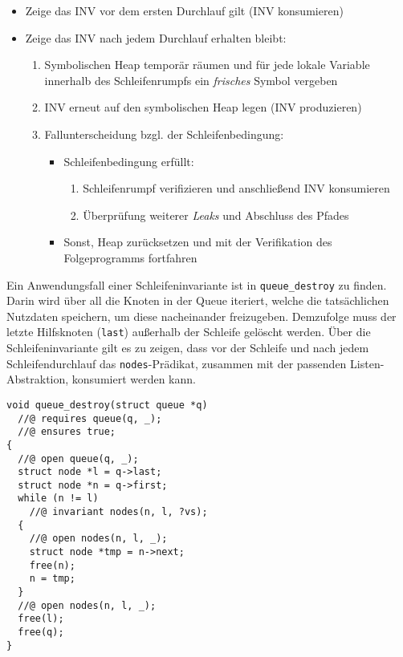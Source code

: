 \begin{itemize}
	\item Zeige das INV vor dem ersten Durchlauf gilt (INV konsumieren)
	\item Zeige das INV nach jedem Durchlauf erhalten bleibt:
	\begin{enumerate}
		\item Symbolischen Heap temporär räumen und für jede lokale Variable innerhalb des Schleifenrumpfs ein \emph{frisches} Symbol vergeben
		\item INV erneut auf den symbolischen Heap legen (INV produzieren)
		\item Fallunterscheidung bzgl. der Schleifenbedingung: %
		\begin{itemize}
			\setlength\itemsep{1ex}
			\item Schleifenbedingung erfüllt:
			\begin{enumerate}
				\item Schleifenrumpf verifizieren und anschließend INV konsumieren
				\item Überprüfung weiterer \emph{Leaks} und Abschluss des Pfades
			\end{enumerate}
			\item Sonst, Heap zurücksetzen und mit der Verifikation des Folgeprogramms fortfahren
		\end{itemize}
	\end{enumerate}
\end{itemize}

\noindent
Ein Anwendungsfall einer Schleifeninvariante ist in \texttt{queue\_destroy} zu finden. Darin wird über all die Knoten in der Queue iteriert, welche die tatsächlichen Nutzdaten speichern, um diese nacheinander freizugeben. Demzufolge muss der letzte Hilfsknoten (\texttt{last}) außerhalb der Schleife gelöscht werden. Über die Schleifeninvariante gilt es zu zeigen, dass vor der Schleife und nach jedem Schleifendurchlauf das \texttt{nodes}-Prädikat, zusammen mit der passenden Listen-Abstraktion, konsumiert werden kann. 

\begin{lstlisting}
void queue_destroy(struct queue *q)
  //@ requires queue(q, _);
  //@ ensures true;
{
  //@ open queue(q, _);
  struct node *l = q->last;
  struct node *n = q->first;
  while (n != l)
    //@ invariant nodes(n, l, ?vs);
  {
    //@ open nodes(n, l, _);
    struct node *tmp = n->next;
    free(n);
    n = tmp;
  }
  //@ open nodes(n, l, _);
  free(l);
  free(q);
}
\end{lstlisting}

